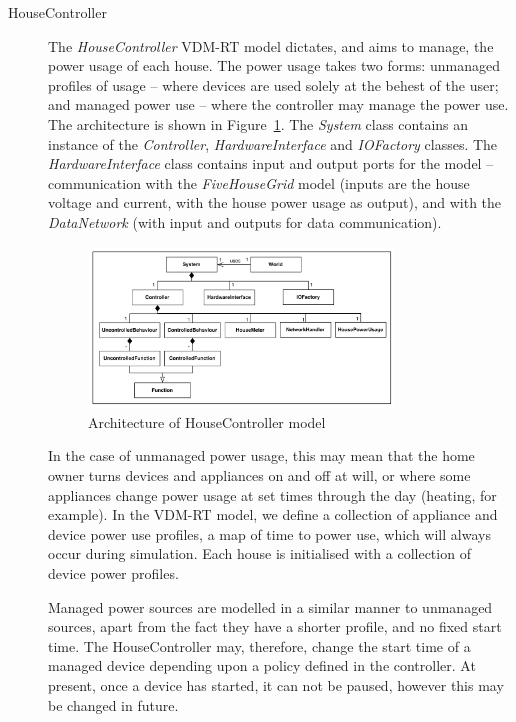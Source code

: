 \begin{description}
\item[HouseController] The \emph{HouseController} VDM-RT model dictates, and aims to manage, the power usage of each house. The power usage takes two forms: unmanaged profiles of usage -- where devices are used solely at the behest of the user; and managed power use -- where the controller may manage the power use. The architecture is shown in Figure~\ref{fig:vdm-house}. The \emph{System} class contains an instance of the \emph{Controller}, \emph{HardwareInterface} and \emph{IOFactory} classes. The \emph{HardwareInterface} class contains input and output ports for the model -- communication with the \emph{FiveHouseGrid} model (inputs are the house voltage and current, with the house power usage as output), and with the \emph{DataNetwork} (with input and outputs for data communication).

\begin{figure}[htb]
\begin{center}
\includegraphics[width=0.8\textwidth]{smartgrid/housecontrollerarch}
\caption{Architecture of HouseController model}
\label{fig:vdm-house}
\end{center}
\end{figure}

In the case of unmanaged power usage, this may mean that the home owner turns devices and appliances on and off at will, or where some appliances change power usage at set times through the day (heating, for example). In the VDM-RT model, we define a collection of appliance and device power use profiles, a map of time to power use, which will always occur during simulation. Each house is initialised with a collection of device power profiles.

Managed power sources are modelled in a similar manner to unmanaged sources, apart from the fact they have a shorter profile, and no fixed start time. The HouseController may, therefore, change the start time of a managed device depending upon a policy defined in the controller. At present, once a device has started, it can not be paused, however this may be changed in future.


\end{description}
